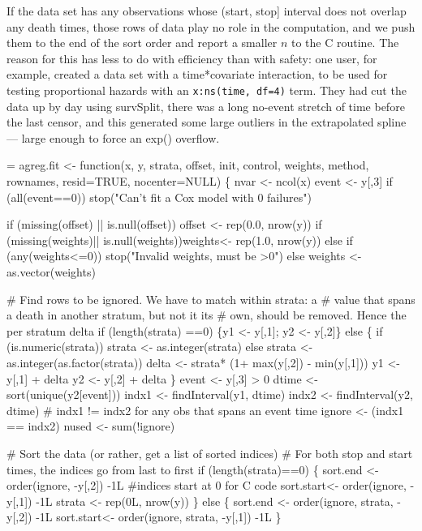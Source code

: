 \documentclass{article}
\newcommand{\code}[1]{\texttt{#1}}
\begin{document}
If the data set has any observations whose (start, stop] interval does not
overlap any death times, those rows of data play no role in the computation,
and we push them to the end of the sort order and report a smaller $n$ to
the C routine.
The reason for this has less to do with efficiency than with safety: one user,
for example, created a data set with a time*covariate interaction, to be
used for testing proportional hazards with an \code{x:ns(time, df=4)} term.
They had cut the data up by day using survSplit, there was a long
no-event stretch of time before the last censor, and this generated some large
outliers in the extrapolated spline --- large enough to force an exp() overflow.

\begin{nwchunk}
=
 agreg.fit <- function(x, y, strata, offset, init, control,
                         weights, method, rownames, resid=TRUE, nocenter=NULL)
     \{
     nvar <- ncol(x)
     event <- y[,3]
     if (all(event==0)) stop("Can't fit a Cox model with 0 failures")
 
     if (missing(offset) || is.null(offset)) offset <- rep(0.0, nrow(y))
     if (missing(weights)|| is.null(weights))weights<- rep(1.0, nrow(y))
     else if (any(weights<=0)) stop("Invalid weights, must be >0")
     else weights <- as.vector(weights)
 
     # Find rows to be ignored.  We have to match within strata: a
     #  value that spans a death in another stratum, but not it its
     #  own, should be removed.  Hence the per stratum delta
     if (length(strata) ==0) \{y1 <- y[,1]; y2 <- y[,2]\}
     else  \{
         if (is.numeric(strata)) strata <- as.integer(strata)
         else strata <- as.integer(as.factor(strata))
         delta  <-  strata* (1+ max(y[,2]) - min(y[,1]))
         y1 <- y[,1] + delta
         y2 <- y[,2] + delta
     \}
     event <- y[,3] > 0
     dtime <- sort(unique(y2[event]))
     indx1 <- findInterval(y1, dtime)
     indx2 <- findInterval(y2, dtime) 
     # indx1 != indx2 for any obs that spans an event time
     ignore <- (indx1 == indx2)
     nused  <- sum(!ignore)
 
     # Sort the data (or rather, get a list of sorted indices)
     #  For both stop and start times, the indices go from last to first
     if (length(strata)==0) \{
         sort.end  <- order(ignore, -y[,2]) -1L #indices start at 0 for C code
         sort.start<- order(ignore, -y[,1]) -1L
         strata <- rep(0L, nrow(y))
         \}
     else \{
         sort.end  <- order(ignore, strata, -y[,2]) -1L
         sort.start<- order(ignore, strata, -y[,1]) -1L
         \}
 

\end{nwchunk}
\end{document}
